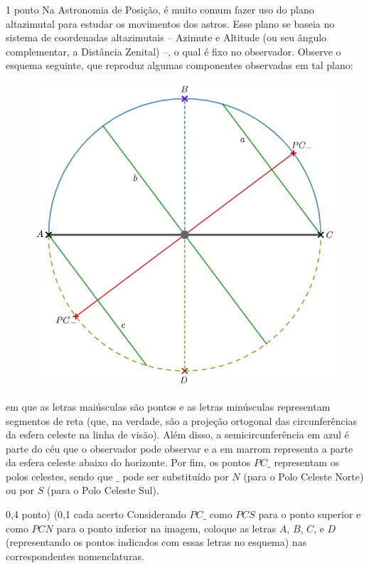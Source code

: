 \documentclass{../lista}
\begin{document}

	\begin{questao}{1 ponto}
		Na Astronomia de Posição, é muito comum fazer uso do plano altazimutal para estudar os movimentos dos astros. Esse plano se baseia no sistema de coordenadas altazimutais -- Azimute e Altitude (ou seu ângulo complementar, a Distância Zenital) --, o qual é fixo no observador. Observe o esquema seguinte, que reproduz algumas componentes observadas em tal plano:
		\begin{figure}[H]
			\centering
			\includegraphics[scale=0.5]{./img/1.png}
		\end{figure}
		em que as letras maiúsculas são pontos e as letras minúsculas representam segmentos de reta (que, na verdade, são a projeção ortogonal das circunferências da esfera celeste na linha de visão). Além disso, a semicircunferência em azul é parte do céu que o observador pode observar e a em marrom representa a parte da esfera celeste abaixo do horizonte. Por fim, os pontos $PC\_$ representam os polos celestes, sendo que $\_$ pode ser substituído por $N$ (para o Polo Celeste Norte) ou por $S$ (para o Polo Celeste Sul).

		\begin{pergunta}{0,4 ponto) (0,1 cada acerto}
			Considerando $PC\_$ como $PCS$ para o ponto superior e como $PCN$ para o ponto inferior na imagem, coloque as letras $A$, $B$, $C$, e $D$ (representando os pontos indicados com essas letras no esquema) nas correspondentes nomenclaturas.


\end{pergunta}
\end{questao}
\end{document}
